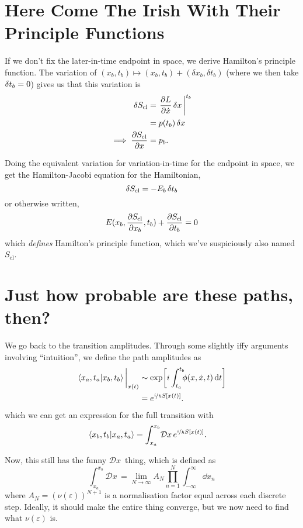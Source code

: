 \documentclass[]{scrreprt}
\renewcommand\hbar\hslash
\newcommand{\DD}[1]{\ensuremath{\mathcal{D} #1\,}}
\begin{document}
\section{Here Come The Irish With Their Principle Functions}
If we don't fix the later-in-time endpoint in space, we derive Hamilton's principle function.
The variation of \( (x_b, t_b) \mapsto (x_b, t_b) + (\delta x_b, \delta t_b)\) (where we then take \(\variation{t_b} = 0\)) gives us that this variation is \begin{align*}
  \variation{S_{\mathrm{cl}}} &= \eval{\pdv{L}{\dot{x}}\variation{x}}^{t_b}\\
  &= p(t_b)\variation{x}\\
  \implies \pdv{S_{\mathrm{cl}}}{x} &= p_b.
\end{align*}

Doing the equivalent variation for variation-in-time for the endpoint in space, we get the Hamilton-Jacobi equation for the Hamiltonian, \[\variation{S_{\mathrm{cl}} = - E_b \variation{t_b}}\] or otherwise written,
\[E(x_b, \pdv{S_{\mathrm{cl}}}{x_b}, t_b) + \pdv{S_{\mathrm{cl}}}{t_b} = 0\] which \emph{defines} Hamilton's principle function, which we've suspiciously also named \(S_{\mathrm{cl}}\).

\section{Just how probable are these paths, then?}
We go back to the transition amplitudes.
Through some slightly iffy arguments involving ``intuition'', we define the path amplitudes as
\begin{align*}
  \eval{\braket{x_a, t_a}{x_b, t_b}}_{x(t)} &\sim \exp[i\int_{t_a}^{t_b} \!\!\!\phi(x, \dot x, t) \dd{t}]\\
  &= e^{\nicefrac{i}{\hbar} S[x(t)]}.
\end{align*}
which we can get an expression for the full transition with
\begin{align*}
  \braket{x_b, t_b}{x_a, t_a} &= \int_{x_a}^{x_b}\!\DD{x} e^{\nicefrac{i}{\hbar} S[x(t)]}.
\end{align*}

Now, this still has the funny \(\DD{x}\) thing, which is defined as
\[\int_{x_a}^{x_b}\!\DD{x} = \lim_{N\to \infty} A_N \prod_{n=1}^N \int_{-\infty}^{\infty} \dd{x_{n}} \] where \(A_N = (\nu(\varepsilon))^{N+1}\) is a normalisation factor equal across each discrete step.
Ideally, it should make the entire thing converge, but we now need to find what \(\nu(\varepsilon)\) is.
\end{document}
